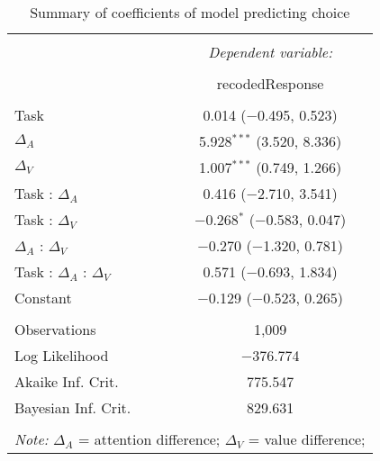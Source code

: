 
\begin{table}[!b] \centering 
  \caption{Summary of coefficients of model predicting choice} 
  \label{table:choiceModel} 
\begin{tabular}{@{\extracolsep{5pt}}lc} 
\\[-1.8ex]\hline 
\hline \\[-1.8ex] 
 & \multicolumn{1}{c}{\textit{Dependent variable:}} \\ 
\cline{2-2} 
\\[-1.8ex] & recodedResponse \\ 
\hline \\[-1.8ex] 
 Task & 0.014 ($-$0.495, 0.523) \\ 
  $\Delta_A$ & 5.928$^{***}$ (3.520, 8.336) \\ 
  $\Delta_V$ & 1.007$^{***}$ (0.749, 1.266) \\ 
  Task : $\Delta_A$ & 0.416 ($-$2.710, 3.541) \\ 
  Task : $\Delta_V$ & $-$0.268$^{*}$ ($-$0.583, 0.047) \\ 
  $\Delta_A$ : $\Delta_V$ & $-$0.270 ($-$1.320, 0.781) \\ 
  Task : $\Delta_A$ :  $\Delta_V$ & 0.571 ($-$0.693, 1.834) \\ 
  Constant & $-$0.129 ($-$0.523, 0.265) \\ 
 \hline \\[-1.8ex] 
Observations & 1,009 \\ 
Log Likelihood & $-$376.774 \\ 
Akaike Inf. Crit. & 775.547 \\ 
Bayesian Inf. Crit. & 829.631 \\ 
\hline 
\hline \\[-1.8ex] 
\multicolumn{2}{l}{\footnotesize \textit{Note:} $\Delta_A$ = attention difference; $\Delta_V$ = value difference; } \\ 
\end{tabular} 
\end{table} 
